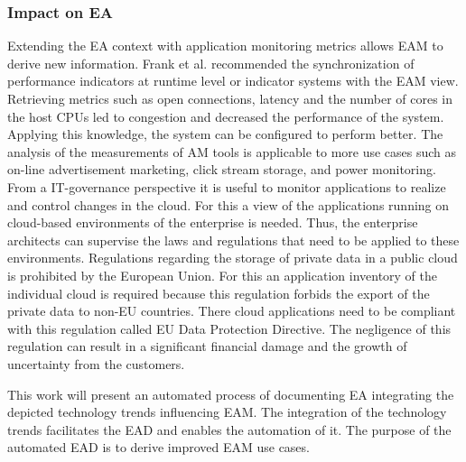 \subsubsection{Impact on EA}
Extending the EA context with application monitoring metrics allows EAM to derive new information. Frank et al. \cite{Frank2009} recommended the synchronization of performance indicators at runtime level or indicator systems with the EAM view. \cite{Frank2009}\cite{Farwick2010} Retrieving metrics such as open connections, latency and the number of cores in the host CPUs led to congestion and decreased the performance of the system. Applying this knowledge, the system can be configured to perform better. \cite{Rabl2012} The analysis of the measurements of AM tools is applicable to more use cases such as  on-line advertisement marketing, click stream storage, and power monitoring. \cite{Rabl2012} 
From a IT-governance perspective it is useful to monitor applications to realize and control changes in the cloud. For this a view of the applications running on cloud-based environments of the enterprise is needed. Thus, the enterprise architects can supervise the laws and regulations that need to be applied to these environments. 
Regulations regarding the storage of private data in a public cloud is prohibited by the European Union. For this an application inventory of the individual cloud is required because this regulation forbids the export of the private data to non-EU countries. There cloud applications need to be compliant with this regulation called EU Data Protection Directive. The negligence of this regulation can result in a significant financial damage and the growth of uncertainty from the customers.\cite{Farwick2010}

This work will present an automated process of documenting EA integrating the depicted technology trends influencing EAM. The integration of the technology trends facilitates the EAD and enables the automation of it. The purpose of the automated EAD is to derive improved EAM use cases.

